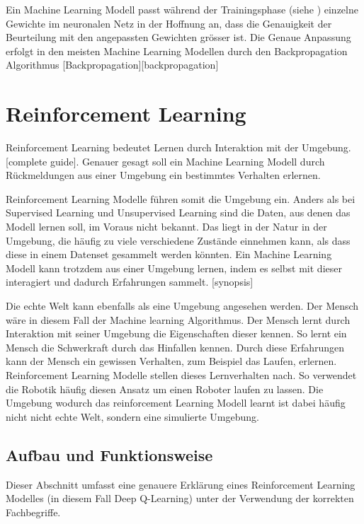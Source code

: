 Ein Machine Learning Modell passt während der Trainingsphase (siehe
) einzelne Gewichte im neuronalen Netz in der
Hoffnung an, dass die Genauigkeit der Beurteilung mit den angepassten Gewichten
grösser ist. Die Genaue Anpassung erfolgt in den meisten Machine Learning
Modellen durch den Backpropagation Algorithmus [Backpropagation][backpropagation]



\section{Reinforcement Learning}
\label{chap:t_rl}
Reinforcement Learning bedeutet Lernen durch Interaktion mit der Umgebung.
[complete guide]. Genauer gesagt soll ein Machine Learning Modell durch
Rückmeldungen aus einer Umgebung ein bestimmtes Verhalten erlernen.

Reinforcement Learning Modelle führen somit die Umgebung ein. Anders als bei
Supervised Learning und Unsupervised Learning sind die Daten, aus denen das
Modell lernen soll, im Voraus nicht bekannt. Das liegt in der Natur in der
Umgebung, die häufig zu viele verschiedene Zustände einnehmen kann, als dass
diese in einem Datenset gesammelt werden könnten. Ein Machine Learning Modell
kann trotzdem aus einer Umgebung lernen, indem es selbst mit dieser interagiert
und dadurch Erfahrungen sammelt. [synopsis]

Die echte Welt kann ebenfalls als eine Umgebung angesehen werden. Der Mensch
wäre in diesem Fall der Machine learning Algorithmus. Der Mensch lernt durch
Interaktion mit seiner Umgebung die Eigenschaften dieser kennen. So lernt ein
Mensch die Schwerkraft durch das Hinfallen kennen. Durch diese Erfahrungen kann
der Mensch ein gewissen Verhalten, zum Beispiel das Laufen, erlernen.
Reinforcement Learning Modelle stellen dieses Lernverhalten nach. So verwendet
die Robotik häufig diesen Ansatz um einen Roboter laufen zu lassen. Die Umgebung
wodurch das reinforcement Learning Modell learnt ist dabei häufig nicht nicht
echte Welt, sondern eine simulierte Umgebung.


\subsection*{Aufbau und Funktionsweise}
Dieser Abschnitt umfasst eine genauere Erklärung eines Reinforcement Learning
Modelles (in diesem Fall Deep Q-Learning) unter der Verwendung der korrekten
Fachbegriffe.

